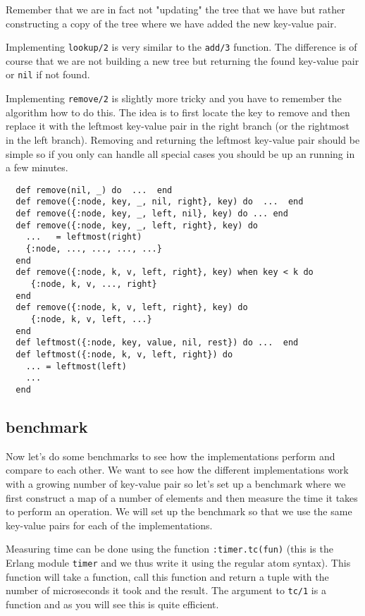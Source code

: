 \documentclass[a4paper,11pt]{article}
\begin{document}
Remember that we are in fact not "updating" the tree that we have but
rather constructing a copy of the tree where we have added the new
key-value pair.

Implementing {\tt lookup/2} is very similar to the {\tt add/3}
function. The difference is of course that we are not building a new
tree but returning the found key-value pair or {\tt nil} if not found.

Implementing {\tt remove/2} is slightly more tricky and you have to
remember the algorithm how to do this. The idea is to first locate the
key to remove and then replace it with the leftmost key-value pair in
the right branch (or the rightmost in the left branch). Removing and
returning the leftmost key-value pair should be simple so if you only
can handle all special cases you should be up an running in a few minutes.

\begin{verbatim}
  def remove(nil, _) do  ...  end
  def remove({:node, key, _, nil, right}, key) do  ...  end
  def remove({:node, key, _, left, nil}, key) do ... end    
  def remove({:node, key, _, left, right}, key) do 
    ...   = leftmost(right)
    {:node, ..., ..., ..., ...}
  end
  def remove({:node, k, v, left, right}, key) when key < k do
     {:node, k, v, ..., right}
  end
  def remove({:node, k, v, left, right}, key) do 
     {:node, k, v, left, ...} 
  end
  def leftmost({:node, key, value, nil, rest}) do ...  end
  def leftmost({:node, k, v, left, right}) do
    ... = leftmost(left)
    ...
  end
\end{verbatim}


\subsection*{benchmark}

Now let's do some benchmarks to see how the implementations perform
and compare to each other. We want to see how the different
implementations work with a growing number of key-value pair so let's
set up a benchmark where we first construct a map of a number of
elements and then measure the time it takes to perform an
operation. We will set up the benchmark so that we use the same
key-value pairs for each of the implementations.

Measuring time can be done using the function {\tt :timer.tc(fun)}
(this is the Erlang module {\tt timer} and we thus write it using the
regular atom syntax). This function will take a function, call this
function and return a tuple with the number of microseconds it took
and the result. The argument to {\tt tc/1} is a function and as you
will see this is quite efficient.
\end{document}
